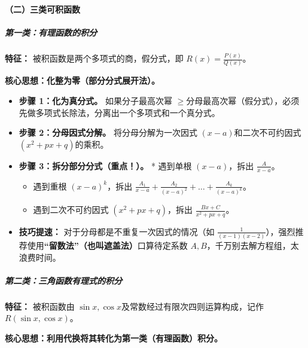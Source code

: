 \documentclass[
]{article}
\begin{document}
\paragraph{（二）三类可积函数}\label{ux4e8cuxff09ux4e09ux7c7bux53efux79efux51fdux6570}

\subparagraph{第一类：有理函数的积分}\label{ux7b2cux4e00ux7c7bux6709ux7406ux51fdux6570ux7684ux79efux5206}

\textbf{特征：} 被积函数是两个多项式的商，假分式，即
\(R(x) = \frac{P(x)}{Q(x)}\)。

\textbf{核心思想：化整为零（部分分式展开法）。}

\begin{itemize}
\item
  \textbf{步骤 1：化为真分式。} 如果分子最高次幂
  \(\ge\)分母最高次幂（假分式），必须先做多项式长除法，分离出一个多项式和一个真分式。
\item
  \textbf{步骤 2：分母因式分解。} 将分母分解为一次因式
  \((x-a)\)和二次不可约因式 \((x^2+px+q)\)的乘积。
\item
  \textbf{步骤 3：拆分部分分式（重点！）。} * 遇到单根 \((x-a)\)，拆出
  \(\frac{A}{x-a}\)。

  \begin{itemize}
  \item
    遇到重根 \((x-a)^k\)，拆出
    \(\frac{A_1}{x-a} + \frac{A_2}{(x-a)^2} + \dots + \frac{A_k}{(x-a)^k}\)。
  \item
    遇到二次不可约因式 \((x^2+px+q)\)，拆出 \(\frac{Bx+C}{x^2+px+q}\)。
  \end{itemize}
\item
  \textbf{技巧提速：} 对于分母都是不重复一次因式的情况（如
  \(\frac{1}{(x-1)(x-2)}\)），强烈推荐使用\textbf{``留数法''（也叫遮盖法）}口算待定系数
  \(A, B\)，千万别去解方程组，太浪费时间。
\end{itemize}

\subparagraph{第二类：三角函数有理式的积分}\label{ux7b2cux4e8cux7c7bux4e09ux89d2ux51fdux6570ux6709ux7406ux5f0fux7684ux79efux5206}

\textbf{特征：} 被积函数由
\(\sin x, \cos x\)及常数经过有限次四则运算构成，记作
\(R(\sin x, \cos x)\)。

\textbf{核心思想：利用代换将其转化为第一类（有理函数）积分。}
\end{document}
